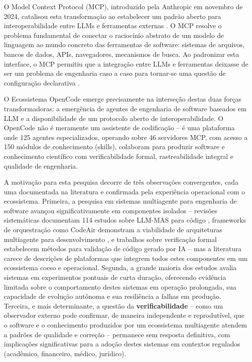 \documentclass[12pt,a4paper,sumario=tradicional,openany]{abntex2}
\begin{document}
O Model Context Protocol (MCP), introduzido pela Anthropic em novembro de 2024, catalisou esta transformação ao estabelecer um padrão aberto para interoperabilidade entre LLMs e ferramentas externas \cite{ayyagari2025mcp}. O MCP resolve o problema fundamental de conectar o raciocínio abstrato de um modelo de linguagem ao mundo concreto das ferramentas de software: sistemas de arquivos, bancos de dados, APIs, navegadores, mecanismos de busca. Ao padronizar esta interface, o MCP permitiu que a integração entre LLMs e ferramentas deixasse de ser um problema de engenharia caso a caso para tornar-se uma questão de configuração declarativa \cite{lei2026survey}.

O Ecossistema OpenCode emerge precisamente na interseção destas duas forças transformadoras: a emergência de agentes de engenharia de software baseados em LLM e a disponibilidade de um protocolo aberto de interoperabilidade. O OpenCode não é meramente um assistente de codificação -- é uma plataforma onde 125 agentes especializados, operando sobre 46 servidores MCP, com acesso a 150 módulos de conhecimento (skills), colaboram para produzir software e conhecimento científico com verificabilidade formal, rastreabilidade integral e qualidade de engenharia.

A motivação para esta pesquisa decorre de três observações convergentes, cada uma documentada na literatura e confirmada pela experiência operacional com o ecossistema. Primeira, a pesquisa em sistemas multiagente para engenharia de software avançou significativamente em componentes isolados -- revisões sistemáticas documentam 114 estudos sobre LLM-MAS para código \cite{rasheed2026llm}, frameworks de orquestração como CodeAir demonstram a viabilidade de arquiteturas multiagente para desenvolvimento \cite{rangel2026codeair}, e trabalhos sobre verificação formal estabelecem métodos para validação de código gerado por IA \cite{antero2024harnessing} -- mas a literatura carece de descrições de plataformas que integrem todos estes componentes em um ecossistema coeso e operacional. Segunda, a grande maioria dos estudos avalia sistemas em experimentos pontuais de curta duração, oferecendo evidência limitada sobre o comportamento destes sistemas em operação prolongada, sua capacidade de evolução autônoma e sua resiliência a falhas em produção. Terceira, e mais determinante, a questão da \textbf{verificabilidade} -- como um observador externo pode confirmar, de maneira independente e reprodutível, que o software e o conhecimento produzidos por um ecossistema multiagente atendem a padrões de qualidade e correção -- permanece sem resposta definitiva, com implicações significativas para a adoção destes sistemas em contextos regulados (acadêmico, financeiro, médico, jurídico).
\end{document}
